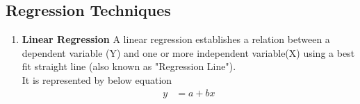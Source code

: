\documentclass[fleqn,10pt]{SelfArx} %
\begin{document}
\subsection{Regression Techniques}
\begin{enumerate}
\item \textbf{Linear Regression}
\newline A linear regression establishes a relation between a dependent variable (Y) and one or more independent variable(X) using a best fit straight line (also known as "Regression Line").
\\ It is represented by below equation 
\begin{subequations}
\begin{align}
y & = a+bx 
\end{align}



\end{subequations}
\end{enumerate}
\end{document}
